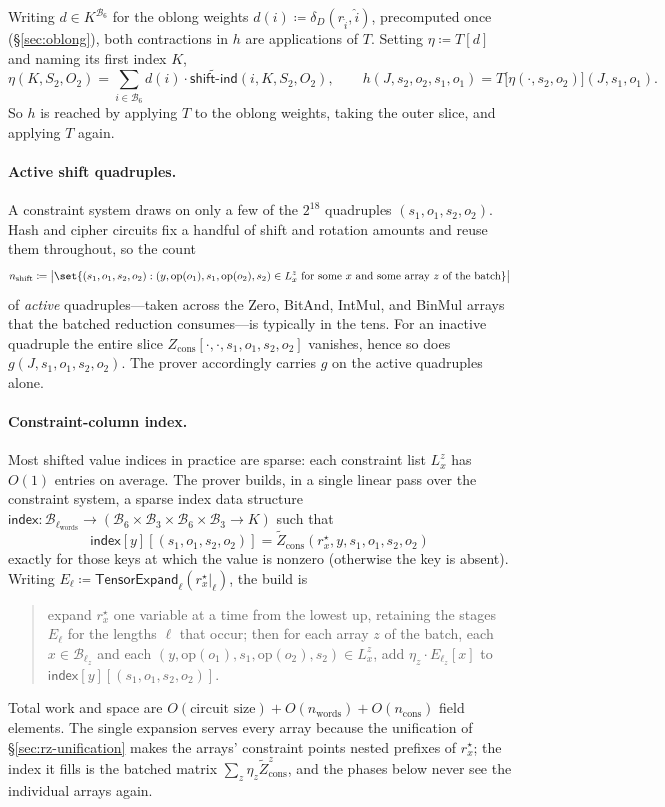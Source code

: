 \documentclass{article}
\theoremstyle{definition}
\newcommand*{\mle}{\widetilde}
\newcommand{\BB}{\mathcal{B}}
\begin{document}
Writing $d \in K^{\BB_6}$ for the oblong weights $d(i) \coloneqq \delta_D(r_{\widehat{i}}, \widehat{i})$, precomputed once (\S\ref{sec:oblong}), both contractions in $h$ are applications of $T$. Setting $\eta \coloneqq T[d]$ and naming its first index $K$,
\[
  \eta(K, S_2, O_2) = \sum_{i \in \BB_6} d(i) \cdot \mle{\textsf{shift-ind}}(i, K, S_2, O_2), \qquad h(J, s_2, o_2, s_1, o_1) = T\bigl[ \eta(\cdot, s_2, o_2) \bigr](J, s_1, o_1).
\]
So $h$ is reached by applying $T$ to the oblong weights, taking the outer slice, and applying $T$ again.

\paragraph{Active shift quadruples.}
A constraint system draws on only a few of the $2^{18}$ quadruples $(s_1, o_1, s_2, o_2)$. Hash and cipher circuits fix a handful of shift and rotation amounts and reuse them throughout, so the count
\[
  n_\text{shift} \coloneqq \bigl| \set{(s_1, o_1, s_2, o_2) : (y, \text{op}(o_1), s_1, \text{op}(o_2), s_2) \in L^z_x \text{ for some } x \text{ and some array } z \text{ of the batch}} \bigr|
\]
of \emph{active} quadruples---taken across the Zero, BitAnd, IntMul, and BinMul arrays that the batched reduction consumes---is typically in the tens. For an inactive quadruple the entire slice $Z_\text{cons}[\cdot, \cdot, s_1, o_1, s_2, o_2]$ vanishes, hence so does $g(J, s_1, o_1, s_2, o_2)$. The prover accordingly carries $g$ on the active quadruples alone.

\paragraph{Constraint-column index.}
Most shifted value indices in practice are sparse: each constraint list $L^z_x$ has $O(1)$ entries on average. The prover builds, in a single linear pass over the constraint system, a sparse index data structure $\textsf{index} \colon \BB_{\ell_\text{words}} \to (\BB_6 \times \BB_3 \times \BB_6 \times \BB_3 \to K)$ such that
\[
  \textsf{index}[y][(s_1, o_1, s_2, o_2)] = \mle{Z}_\text{cons}(r^\star_x, y, s_1, o_1, s_2, o_2)
\]
exactly for those keys at which the value is nonzero (otherwise the key is absent). Writing $E_\ell \coloneqq \textsf{TensorExpand}_\ell(r^\star_x|_\ell)$, the build is
\begin{quote}
  expand $r^\star_x$ one variable at a time from the lowest up, retaining the stages $E_\ell$ for the lengths $\ell$ that occur; then for each array $z$ of the batch, each $x \in \BB_{\ell_z}$ and each $(y, \text{op}(o_1), s_1, \text{op}(o_2), s_2) \in L^z_x$, add $\eta_z \cdot E_{\ell_z}[x]$ to $\textsf{index}[y][(s_1, o_1, s_2, o_2)]$.
\end{quote}
Total work and space are $O(\text{circuit size}) + O(n_\text{words}) + O(n_\text{cons})$ field elements. The single expansion serves every array because the unification of \S\ref{sec:rz-unification} makes the arrays' constraint points nested prefixes of $r^\star_x$; the index it fills is the batched matrix $\sum_z \eta_z \mle{Z}^z_\text{cons}$, and the phases below never see the individual arrays again.
\end{document}
